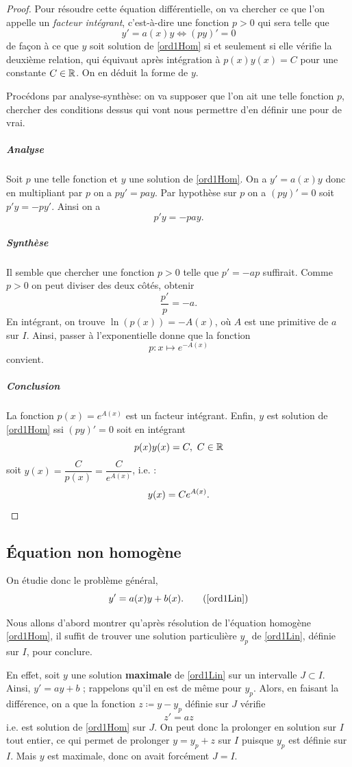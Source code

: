\documentclass[../main.tex]{subfiles}
\begin{document}
\begin{proof}
Pour résoudre cette équation différentielle, on va chercher ce que l'on appelle un \textit{facteur intégrant}, c'est-à-dire une fonction $p>0$ qui sera telle que
	\[
    y' = a(x)y\Longleftrightarrow
    (py)' = 0
    \]
de façon à ce que $y$ soit solution de \eqref{ord1Hom} si et seulement si elle vérifie la deuxième relation, qui équivaut après intégration à $p(x)y(x) = C$ pour une constante $C\in\mathbb R$. On en déduit la forme de $y$.

Procédons par analyse-synthèse: on va supposer que l'on ait une telle fonction $p$, chercher des conditions dessus qui vont nous permettre d'en définir une pour de vrai.

\subparagraph{Analyse} Soit $p$ une telle fonction et $y$ une solution de \eqref{ord1Hom}. On a $y' = a(x)y$ donc en multipliant par $p$ on a $py' = pay$. Par hypothèse sur $p$ on a $(py)' = 0$ soit $p'y = - py'$. Ainsi on a \[p'y = -pay.\]

\subparagraph{Synthèse} Il semble que chercher une fonction $p>0$ telle que $p' = -ap$ suffirait. Comme $p>0$ on peut diviser des deux côtés, obtenir
	\begin{equation*}
    \frac{p'}{p} = -a.
    \end{equation*}
En intégrant, on trouve $\ln(p(x)) = -A(x)$, où $A$ est une primitive de $a$ sur $I$. Ainsi, passer à l'exponentielle donne que la fonction \[p:x\longmapsto e^{-A(x)}\] 
convient.

\subparagraph{Conclusion} La fonction $p(x)=e^{A(x)}$ est un facteur intégrant. Enfin, $y$ est solution de \eqref{ord1Hom} ssi $(py)'=0$ soit en intégrant
	\[
    p(x)y(x) = C,\ C\in\R
    \]
soit $y(x) = \dfrac{C}{p(x)}=\dfrac{C}{e^{A(x)}}$, i.e. :
	\[
	y(x) = Ce^{A(x)}.\qedhere
	\]
\end{proof}

\subsection{Équation non homogène}

On étudie donc le problème général,
	\[
    y' = a(x)y + b(x).
    \tag{\ref{ord1Lin}}
    \]

Nous allons d'abord montrer qu'après résolution de l'équation homogène \eqref{ord1Hom}, il suffit de trouver une solution particulière $y_p$ de \eqref{ord1Lin}, définie sur $I$, pour conclure.

En effet, soit $y$ une solution \textbf{maximale} de \eqref{ord1Lin} sur un intervalle $J\subset I$. Ainsi, $y' = ay + b$ ; rappelons qu'il en est de même pour $y_p$. Alors, en faisant la différence, on a que la fonction $z\coloneqq y-y_p$ définie sur $J$ vérifie
	\[ 
	z' = az
	 \]
i.e. est solution de \eqref{ord1Hom} sur $J$. On peut donc la prolonger en solution sur $I$ tout entier, ce qui permet de prolonger $y = y_p + z$ sur $I$ puisque $y_p$ est définie sur $I$. Mais $y$ est maximale, donc on avait forcément $J=I$.
\end{document}
